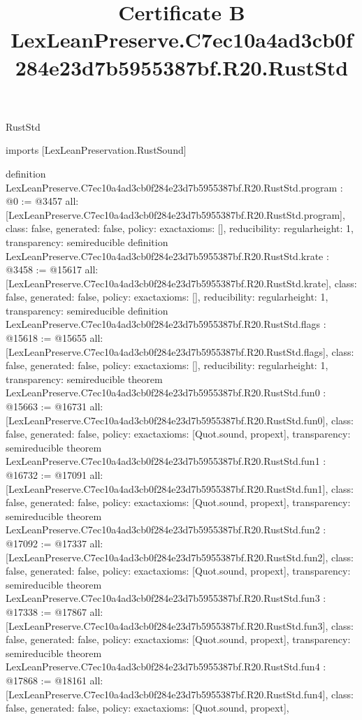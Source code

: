 \begin{lexlean}{RustStd}
\title{Certificate B LexLeanPreserve.C7ec10a4ad3cb0f284e23d7b5955387bf.R20.RustStd}
\begin{coremodule}
imports [LexLeanPreservation.RustSound]

definition LexLeanPreserve.C7ec10a4ad3cb0f284e23d7b5955387bf.R20.RustStd.program : @0 := @3457 {
  all: [LexLeanPreserve.C7ec10a4ad3cb0f284e23d7b5955387bf.R20.RustStd.program],
  class: false,
  generated: false,
  policy: exact{axioms: []},
  reducibility: regular{height: 1},
  transparency: semireducible
}
definition LexLeanPreserve.C7ec10a4ad3cb0f284e23d7b5955387bf.R20.RustStd.krate : @3458 := @15617 {
  all: [LexLeanPreserve.C7ec10a4ad3cb0f284e23d7b5955387bf.R20.RustStd.krate],
  class: false,
  generated: false,
  policy: exact{axioms: []},
  reducibility: regular{height: 1},
  transparency: semireducible
}
definition LexLeanPreserve.C7ec10a4ad3cb0f284e23d7b5955387bf.R20.RustStd.flags : @15618 := @15655 {
  all: [LexLeanPreserve.C7ec10a4ad3cb0f284e23d7b5955387bf.R20.RustStd.flags],
  class: false,
  generated: false,
  policy: exact{axioms: []},
  reducibility: regular{height: 1},
  transparency: semireducible
}
theorem LexLeanPreserve.C7ec10a4ad3cb0f284e23d7b5955387bf.R20.RustStd.fun0 : @15663 := @16731 {
  all: [LexLeanPreserve.C7ec10a4ad3cb0f284e23d7b5955387bf.R20.RustStd.fun0],
  class: false,
  generated: false,
  policy: exact{axioms: [Quot.sound, propext]},
  transparency: semireducible
}
theorem LexLeanPreserve.C7ec10a4ad3cb0f284e23d7b5955387bf.R20.RustStd.fun1 : @16732 := @17091 {
  all: [LexLeanPreserve.C7ec10a4ad3cb0f284e23d7b5955387bf.R20.RustStd.fun1],
  class: false,
  generated: false,
  policy: exact{axioms: [Quot.sound, propext]},
  transparency: semireducible
}
theorem LexLeanPreserve.C7ec10a4ad3cb0f284e23d7b5955387bf.R20.RustStd.fun2 : @17092 := @17337 {
  all: [LexLeanPreserve.C7ec10a4ad3cb0f284e23d7b5955387bf.R20.RustStd.fun2],
  class: false,
  generated: false,
  policy: exact{axioms: [Quot.sound, propext]},
  transparency: semireducible
}
theorem LexLeanPreserve.C7ec10a4ad3cb0f284e23d7b5955387bf.R20.RustStd.fun3 : @17338 := @17867 {
  all: [LexLeanPreserve.C7ec10a4ad3cb0f284e23d7b5955387bf.R20.RustStd.fun3],
  class: false,
  generated: false,
  policy: exact{axioms: [Quot.sound, propext]},
  transparency: semireducible
}
theorem LexLeanPreserve.C7ec10a4ad3cb0f284e23d7b5955387bf.R20.RustStd.fun4 : @17868 := @18161 {
  all: [LexLeanPreserve.C7ec10a4ad3cb0f284e23d7b5955387bf.R20.RustStd.fun4],
  class: false,
  generated: false,
  policy: exact{axioms: [Quot.sound, propext]},
}
\end{coremodule}
\end{lexlean}
